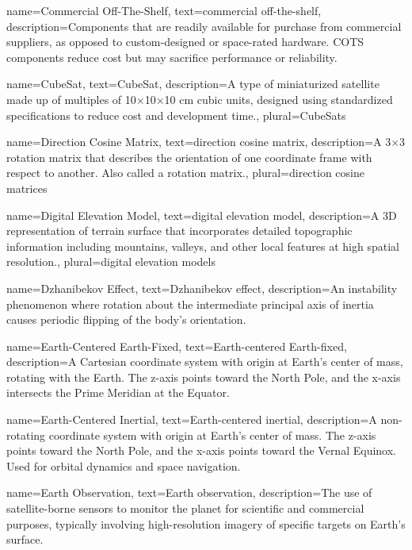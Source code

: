{
	name=Commercial Off-The-Shelf,
	text=commercial off-the-shelf,
	description={Components that are readily available for purchase from commercial suppliers, as opposed to custom-designed or space-rated hardware. COTS components reduce cost but may sacrifice performance or reliability.}
}

{
	name=CubeSat,
	text=CubeSat,
	description={A type of miniaturized satellite made up of multiples of 10×10×10 cm cubic units, designed using standardized specifications to reduce cost and development time.},
	plural=CubeSats
}

{
	name=Direction Cosine Matrix,
	text=direction cosine matrix,
	description={A 3×3 rotation matrix that describes the orientation of one coordinate frame with respect to another. Also called a rotation matrix.},
	plural=direction cosine matrices
}

{
	name=Digital Elevation Model,
	text=digital elevation model,
	description={A 3D representation of terrain surface that incorporates detailed topographic information including mountains, valleys, and other local features at high spatial resolution.},
	plural=digital elevation models
}

{
	name=Dzhanibekov Effect,
	text=Dzhanibekov effect,
	description={An instability phenomenon where rotation about the intermediate principal axis of inertia causes periodic flipping of the body's orientation.}
}

{
	name=Earth-Centered Earth-Fixed,
	text=Earth-centered Earth-fixed,
	description={A Cartesian coordinate system with origin at Earth's center of mass, rotating with the Earth. The z-axis points toward the North Pole, and the x-axis intersects the Prime Meridian at the Equator.}
}

{
	name=Earth-Centered Inertial,
	text=Earth-centered inertial,
	description={A non-rotating coordinate system with origin at Earth's center of mass. The z-axis points toward the North Pole, and the x-axis points toward the Vernal Equinox. Used for orbital dynamics and space navigation.}
}

{
	name=Earth Observation,
	text=Earth observation,
	description={The use of satellite-borne sensors to monitor the planet for scientific and commercial purposes, typically involving high-resolution imagery of specific targets on Earth's surface.}
}

